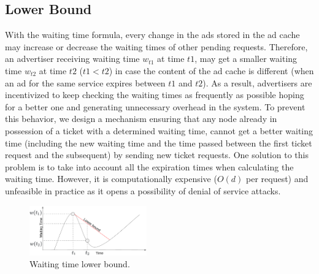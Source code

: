 \subsection{Lower Bound}
With the waiting time formula, every change in the ads stored in the ad cache may increase or decrease the waiting times of other pending requests. 
Therefore, an advertiser receiving waiting time $w_{t1}$ at time $t1$, may get a smaller waiting time $w_{t2}$ at time $t2$ ($t1 < t2$) in case the content of the ad cache is different (\eg when an ad for the same service expires between $t1$ and $t2$). 
As a result, advertisers are incentivized to keep checking the waiting times as frequently as possible hoping for a better one and generating unnecessary overhead in the system.
To prevent this behavior, we design a mechanism ensuring that any node already in possession of a ticket with a determined waiting time, cannot get a better waiting time (including the new waiting time and the time passed between the first ticket request and the subsequent) by sending new ticket requests.
One solution to this problem is to take into account all the expiration times when calculating the waiting time. 
However, it is computationally expensive (\eg $O(d)$ per request) and unfeasible in practice as it opens a possibility of denial of service attacks. 

\begin{figure}
    \includegraphics[width=0.45\textwidth]{img/lower_bound.png}
    \vspace{-0.05in}
    \caption{Waiting time lower bound.}
    \label{fig:lower_bound}
    \vspace{-0.15in}
\end{figure}

